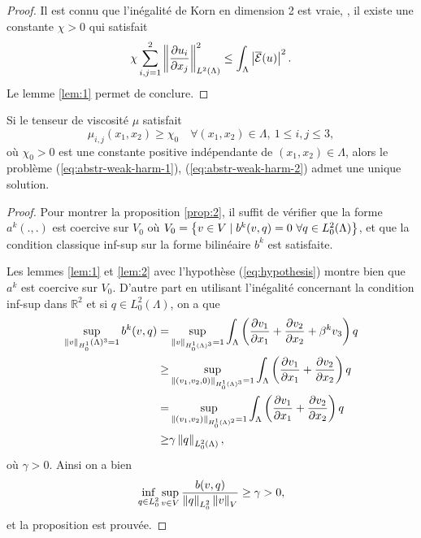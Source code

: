 \begin{proof}
Il est connu que l'inégalité de Korn en dimension 2 est vraie, \ie, il
existe une constante $\chi > 0$ qui satisfait
\begin{equation}
\chi\sum_{i,j = 1}^2 \left\lVert \frac{\partial u_i}{\partial
    x_j} \right\rVert^2_{L^2(\Lambda)} \leq \int_\Lambda \left\lvert \overline{\mathcal E}(u) \right\rvert^2.
\end{equation}
Le lemme \ref{lem:1} permet de conclure.
\end{proof}

\begin{proposition}\label{prop:2}
  Si le tenseur de viscosité $\mu$ satisfait
\begin{equation}
  \mu_{i,j}(x_1,x_2) \geq \chi_0\quad \forall (x_1, x_2)\in \Lambda,\ 1
  \leq i,j \leq 3,\label{eq:hypothesis}
\end{equation}
où $\chi_0 > 0$ est une constante positive indépendante de $(x_1,
x_2)\in \Lambda$, alors le problème (\ref{eq:abstr-weak-harm-1}),
(\ref{eq:abstr-weak-harm-2}) admet une unique solution.
\end{proposition}

\begin{proof}
  Pour montrer la proposition \ref{prop:2}, il suffit de vérifier
  que la forme $a^k(.,.)$ est coercive sur $V_0$ où $V_0 = \left\{ v
    \in V\mid b^k(v, q) = 0\ \forall q \in
    L^2_0(\Lambda) \right\}$, et que la condition classique inf-sup sur la forme
  bilinéaire $b^k$ est satisfaite.

  Les lemmes \ref{lem:1} et \ref{lem:2} avec l'hypothèse (\ref{eq:hypothesis}) montre
  bien que $a^k$ est coercive sur $V_0$. D'autre part en utilisant
  l'inégalité concernant la condition inf-sup dans $\mathbb R^2$ et si
  $q\in L^2_0(\Lambda)$, on a que
  \begin{align*}
    \sup_{\left\lVert v \right\rVert_{H^1_0}(\Lambda)^3 = 1} b^k(v,q) = &\sup_{\left\lVert v \right\rVert_{H^1_0(\Lambda)^3} = 1} \int_{\Lambda}\left( \frac{\partial v_1}{\partial x_1} + \frac{\partial v_2}{\partial x_2} + \beta^k v_3 \right)q\\
    \geq & \sup_{\left\lVert (v_1, v_2, 0) \right\rVert_{H^1_0(\Lambda)^3} =
      1}\int_{\Lambda}\left( \frac{\partial v_1}{\partial x_1} +
      \frac{\partial v_2}{\partial x_2} \right)q\\
    = & \sup_{\left\lVert (v_1, v_2) \right\rVert_{H^1_0(\Lambda)^2} = 1}\int_{\Lambda}\left( \frac{\partial v_1}{\partial x_1} + \frac{\partial v_2}{\partial x_2} \right)q\\
    \geq& \gamma \left\lVert q \right\rVert_{L^2_0(\Lambda)},
  \end{align*}
  où $\gamma > 0$. Ainsi on a bien
  \begin{equation*}
    \inf_{q\in L^2_0}\sup_{v\in V} \frac{b(v,
      q)}{\left\lVert q \right\rVert_{L^2_0}\left\lVert v \right\rVert_{V}} \geq \gamma > 0,
  \end{equation*}
  et la proposition est prouvée.
\end{proof}

